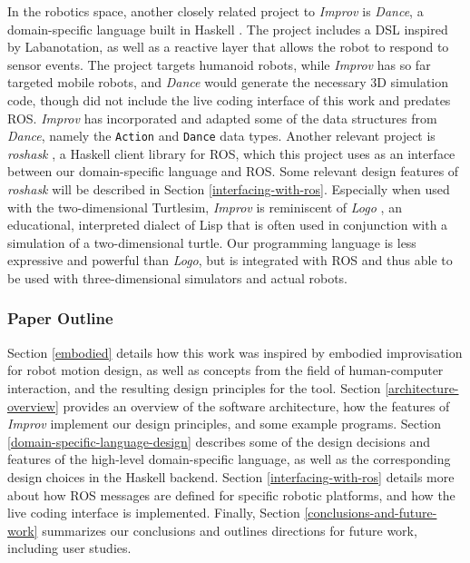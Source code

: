 \documentclass[sigchi-a]{acmart}
\begin{document}
In the robotics space, another closely related project to \emph{Improv} is \emph{Dance}, a
domain-specific language built in Haskell \cite{Dance2003}. The project includes
a DSL inspired by Labanotation, as well as a reactive layer that allows the
robot to respond to sensor events. The project targets humanoid robots, while
\emph{Improv} has so far targeted mobile robots, and \emph{Dance} would generate
the necessary 3D simulation code, though did not include the live coding
interface of this work and predates ROS. \emph{Improv} has incorporated and
adapted some of the data structures from \emph{Dance}, namely the
\texttt{Action} and \texttt{Dance} data types. Another relevant project is
\emph{roshask} \cite{cowley2011stream}, a Haskell client library for ROS, which
this project uses as an interface between our domain-specific language and ROS.
Some relevant design features of \emph{roshask} will be described in Section
\ref{interfacing-with-ros}. Especially when used with the two-dimensional Turtlesim, \emph{Improv}
is reminiscent of \emph{Logo} \cite{logo}, an educational, interpreted
dialect of Lisp that is often used in conjunction with a simulation of a
two-dimensional turtle. Our programming language is less expressive and powerful 
than \emph{Logo}, but is integrated with ROS and thus able to be used with
three-dimensional simulators and actual robots.

\subsubsection*{Paper Outline}

Section \ref{embodied} details how this work was inspired by embodied
improvisation for robot motion design, as well as concepts from the field of human-computer
interaction, and the resulting design principles for the tool.
Section
\ref{architecture-overview} provides an overview of the software architecture,
how the features of \emph{Improv} implement
our design principles, and some example programs. Section
\ref{domain-specific-language-design} describes some of the design decisions and
features of the high-level domain-specific language, as well as the
corresponding design choices in the Haskell backend. 
Section \ref{interfacing-with-ros} details more about how ROS messages are
defined for specific robotic platforms, and how the live coding interface is
implemented. Finally, Section
\ref{conclusions-and-future-work} summarizes our conclusions and outlines directions
for future work, including user studies.
\end{document}
